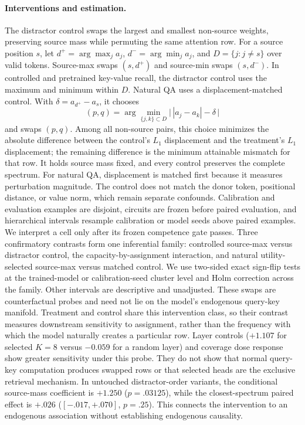 \documentclass[letterpaper]{article} %
\begin{document}
\paragraph{Interventions and estimation.}
The distractor control swaps the largest and smallest non-source weights, preserving source mass while
permuting the same attention row. For a source position $s$, let $d^+=\arg\max_j a_j$,
$d^-=\arg\min_j a_j$, and $D=\{j:j\ne s\}$ over valid tokens. Source-max swaps $(s,d^+)$ and source-min
swaps $(s,d^-)$. In controlled and pretrained key-value recall, the distractor control uses the maximum and
minimum within $D$. Natural QA uses a displacement-matched control. With
$\delta=a_{d^+}-a_s$, it chooses
\begin{equation}
 (p,q)=\arg\min_{\{j,k\}\subset D}
 \big\vert\,|a_j-a_k|-\delta\,\big\vert
 \label{eq:matched-control}
\end{equation}
and swaps $(p,q)$. Among all non-source pairs, this choice minimizes the absolute difference between the
control's $L_1$ displacement and the treatment's $L_1$ displacement; the remaining difference is the minimum
attainable mismatch for that row. It holds source mass fixed, and every control preserves the complete spectrum.
For natural QA, displacement is matched first because it measures perturbation magnitude. The control does not
match the donor token, positional distance, or value norm, which remain separate confounds. Calibration and
evaluation examples are disjoint, circuits are frozen before paired evaluation, and hierarchical intervals
resample calibration or model seeds above paired examples. We interpret a cell only after its frozen
competence gate passes.
Three confirmatory contrasts form one inferential family: controlled source-max versus distractor control,
the capacity-by-assignment interaction, and natural utility-selected source-max versus matched control. We use
two-sided exact sign-flip tests at the trained-model or calibration-seed cluster level and Holm correction across
the family. Other intervals are descriptive and unadjusted.
These swaps are counterfactual probes and need not lie on the model's endogenous query-key manifold. Treatment
and control share this intervention class, so their contrast measures downstream sensitivity to assignment,
rather than the frequency with which the model naturally creates a particular row. Layer controls ($+1.107$ for
selected $K=8$ versus $-0.059$ for a random layer) and coverage dose response show greater sensitivity under this
probe. They do not show that normal query-key computation produces swapped rows or that selected heads are the
exclusive retrieval mechanism. In untouched distractor-order variants, the conditional source-mass coefficient
is $+1.250$ ($p=.03125$), while the closest-spectrum paired effect is $+.026$ ($[-.017,+.070]$, $p=.25$).
This connects the intervention to an endogenous association without establishing endogenous causality.
\end{document}
